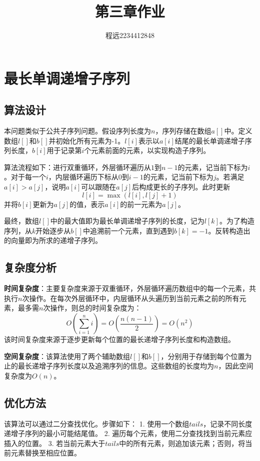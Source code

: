 \documentclass[UTF8]{ctexart}
\begin{document}
\title{\vspace{0cm}第三章作业}
\author{程远2234412848}
\date{}
\maketitle
\tableofcontents
\newpage

\section{最长单调递增子序列}

\subsection{算法设计}
本问题类似于公共子序列问题。假设序列长度为$n$，序列存储在数组$a[]$中。定义数组$l[]$和$b[]$并初始化所有元素为-1。$l[i]$表示以$a[i]$结尾的最长单调递增子序列长度，$b[i]$用于记录第$i$个元素前面的元素，以实现构造子序列。

算法流程如下：进行双重循环，外层循环遍历从$1$到$n-1$的元素，记当前下标为$i$。对于每一个$i$，内层循环遍历下标从$0$到$i-1$的元素，记当前下标为$j$。若满足$a[i] > a[j]$，说明$a[i]$可以跟随在$a[j]$后构成更长的子序列。此时更新
\[
l[i] = \max(l[i], l[j] + 1)
\]
并将$b[i]$更新为$a[j]$的值，表示$a[i]$的前一元素为$a[j]$。

最终，数组$l[]$中的最大值即为最长单调递增子序列的长度，记为$l[k]$。为了构造序列，从$k$开始逐步从$b[]$中追溯前一个元素，直到遇到$b[k] = -1$。反转构造出的向量即为所求的递增子序列。

\subsection{复杂度分析}

\textbf{时间复杂度}：主要复杂度来源于双重循环，外层循环遍历数组中的每一个元素，共执行$n$次操作。在每次外层循环中，内层循环从头遍历到当前元素之前的所有元素，最多需$n$次操作，则总的时间复杂度为：
\[
O\left(\sum_{i=1}^{n} i\right) = O\left(\frac{n(n-1)}{2}\right) = O(n^2)
\]
该时间复杂度来源于逐步更新每个位置的最长递增子序列长度和构造数组。


\textbf{空间复杂度}：该算法使用了两个辅助数组$l[]$和$b[]$，分别用于存储到每个位置为止的最长递增子序列长度以及追溯序列的信息。这些数组的长度均为$n$，因此空间复杂度为$O(n)$。

\subsection{优化方法}
该算法可以通过二分查找优化。步骤如下：
1. 使用一个数组$tails$，记录不同长度递增子序列的最小可能结尾值。
2. 遍历每个元素，使用二分查找找到当前元素应插入的位置。
3. 若当前元素大于$tails$中的所有元素，则追加该元素；否则，将当前元素替换至相应位置。
\end{document}
